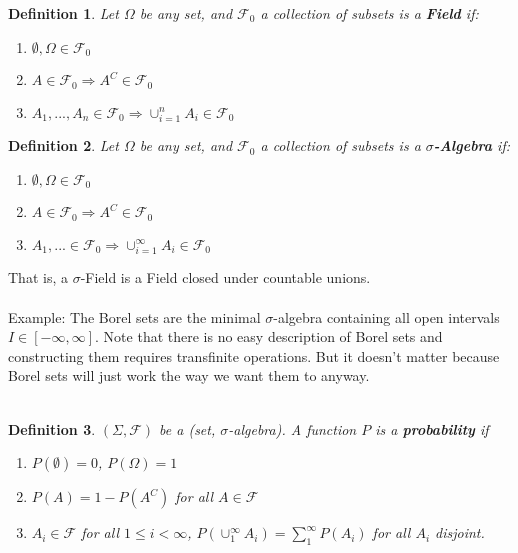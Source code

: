 \documentclass[12pt]{article}
\newtheorem{defn}{Definition}
\begin{document}
\begin{defn}
Let $\Omega$ be any set, and $\mathcal{F}_0$ a collection of subsets is a {\bf Field} if:

\begin{enumerate}
\item  $\emptyset, \Omega \in \mathcal{F}_0$
\item  $A \in \mathcal{F}_0 \Rightarrow A^C \in \mathcal{F}_0$
\item  $A_1, ..., A_n \in \mathcal{F}_0 \Rightarrow \cup_{i=1}^n A_i \in \mathcal{F}_0$
\end{enumerate}

\end{defn}

\begin{defn}
Let $\Omega$ be any set, and $\mathcal{F}_0$ a collection of subsets is a {\bf $\sigma$-Algebra} if:

\begin{enumerate}
\item  $\emptyset, \Omega \in \mathcal{F}_0$
\item  $A \in \mathcal{F}_0 \Rightarrow A^C \in \mathcal{F}_0$
\item  $A_1, ... \in \mathcal{F}_0 \Rightarrow \cup_{i=1}^\infty A_i \in \mathcal{F}_0$
\end{enumerate}

\end{defn}

That is, a $\sigma$-Field is a Field closed under countable unions.
\\ \\
Example: The Borel sets are the minimal $\sigma$-algebra containing all open intervals $I \in [-\infty, \infty]$.  Note that there is no easy description of Borel sets and constructing them requires transfinite operations.  But it doesn't matter because Borel sets will just work the way we want them to anyway.
\\ \\

\begin{defn}
$(\Sigma, \mathcal{F})$ be a (set, $\sigma$-algebra).  A function $P$ is a {\bf probability} if

\begin{enumerate}
\item $P(\emptyset) = 0$, $P(\Omega) = 1$
\item $P(A) = 1 - P(A^C)$ for all $A \in \mathcal{F}$
\item $A_i \in \mathcal{F}$ for all $1 \le i < \infty$, $P(\cup_1^\infty A_i) = \sum_1^\infty P(A_i)$ for all $A_i$ disjoint.
\end{enumerate}

\end{defn}
\end{document}

